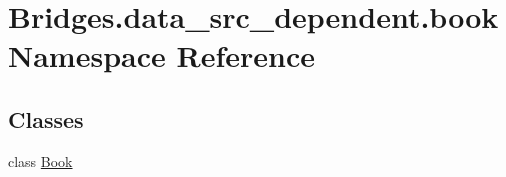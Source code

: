 \hypertarget{namespace_bridges_1_1data__src__dependent_1_1book}{}\section{Bridges.\+data\+\_\+src\+\_\+dependent.\+book Namespace Reference}
\label{namespace_bridges_1_1data__src__dependent_1_1book}
\subsection*{Classes}
\begin{DoxyCompactItemize}
\item 
class \hyperlink{class_bridges_1_1data__src__dependent_1_1book_1_1_book}{Book}
\end{DoxyCompactItemize}
